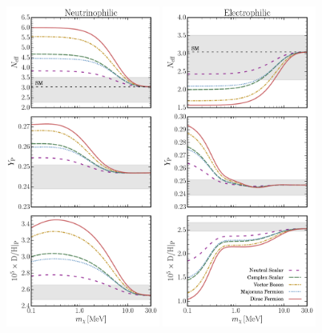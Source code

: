 \begin{figure}[h]
    \centering
    \includegraphics[width=0.45\textwidth]{figures/Nu_abundance_plot.pdf} \qquad
    \includegraphics[width=0.45\textwidth]{figures/EE_abundance_plot.pdf}\vspace{-0.2cm}

\end{figure}
